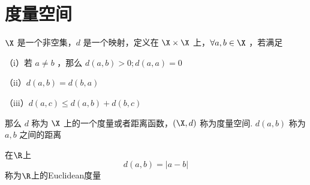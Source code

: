\section{度量空间}
\begin{definition}
	$\X$ 是一个非空集，$d$ 是一个映射，定义在 $\X \times \X$ 上，$\forall a, b \in \X$ ，若满足
	
	（i）若 $a \neq b$ ，那么 $d(a, b)>0 ; d(a, a)=0$
	
	（ii）$d(a, b)=d(b, a)$
	
	（iii）$d(a, c) \leqslant d(a, b)+d(b, c)$
	
	那么 $d$ 称为 $\X$ 上的一个度量或者距离函数，$(\X, d)$ 称为度量空间. $d(a, b)$ 称为$a, b$ 之间的距离
\end{definition}
在$\R$上\[d(a,b)=|a-b|\]
称为$\R$上的Euclidean度量

